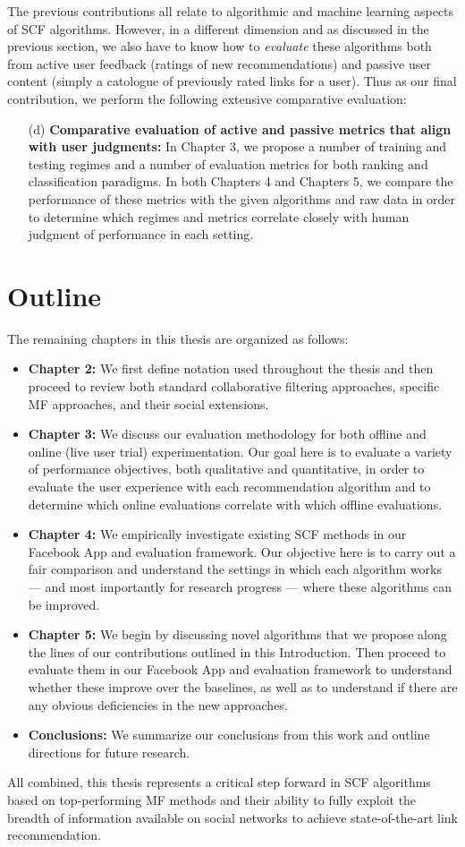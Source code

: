 The previous contributions all relate to algorithmic and machine
learning aspects of SCF algorithms.  However, in a different dimension
and as discussed in the previous section, we also have to know how to
\emph{evaluate} these algorithms both from active user feedback
(ratings of new recommendations) and passive user content (simply a
catologue of previously rated links for a user).  Thus as our final
contribution, we perform the following extensive comparative
evaluation:
\begin{enumerate}
\item[(d)] {\bf Comparative evaluation of active and passive metrics 
that align with user judgments:} 
In Chapter 3, we
propose a number of training and testing regimes and a number of
evaluation metrics for both ranking and classification paradigms.  In
both Chapters 4 and Chapters 5, we compare
the performance of these metrics with the given algorithms and raw
data in order to determine which regimes and metrics correlate closely
with human judgment of performance in each setting.
\end{enumerate}

\section{Outline}

The remaining chapters in this thesis are organized as follows:
\begin{itemize}
\item {\bf Chapter 2:} We first define notation
used throughout the thesis and then proceed to review both standard
collaborative filtering approaches, specific MF approaches, and
their social extensions.
\item {\bf Chapter 3:} We discuss our evaluation
methodology for both offline and online (live user trial) experimentation.
Our goal here is to evaluate a variety of performance objectives,
both qualitative and quantitative, in order to evaluate the user
experience with each recommendation algorithm and to determine
which online evaluations correlate with which offline evaluations.
\item {\bf Chapter 4:} We empirically investigate 
existing SCF methods in our Facebook App and evaluation framework.
Our objective here is to carry out a fair comparison and understand
the settings in which each algorithm works --- and most importantly
for research progress --- where these algorithms can be improved.
\item {\bf Chapter 5:} We begin by discussing novel
algorithms that we propose along the lines of our contributions
outlined in this Introduction. Then proceed to evaluate
them in our Facebook App and evaluation framework to understand
whether these improve over the baselines, as well as to understand
if there are any obvious deficiencies in the new approaches.
\item {\bf Conclusions:} We summarize our conclusions
from this work and outline directions for future research.
\end{itemize}

All combined, this thesis represents a critical step forward in SCF
algorithms based on top-performing MF methods and their ability to
fully exploit the breadth of information available on social networks
to achieve state-of-the-art link recommendation.

